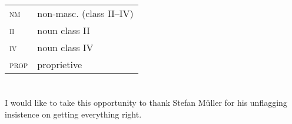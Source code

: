 \documentclass[output=paper
 	        ,biblatex
                ,babelshorthands
                ,newtxmath
                ,draftmode
                ,colorlinks, citecolor=brown
]{langscibook}
\begin{document}
\begin{tabularx}{.99\textwidth}{@{}lX}
\textsc{nm}   & non-masc. (class II--IV)\\
\textsc{ii}   & noun class II\\
\textsc{iv}   & noun class IV\\
\textsc{prop} & proprietive\\
\end{tabularx}


\section*{\acknowledgmentsEN}

I would like to take this opportunity to thank Stefan Müller for his unflagging insistence on getting everything right. 

{\sloppy
\printbibliography[heading=subbibliography,notkeyword=this] 
}
\end{document}
